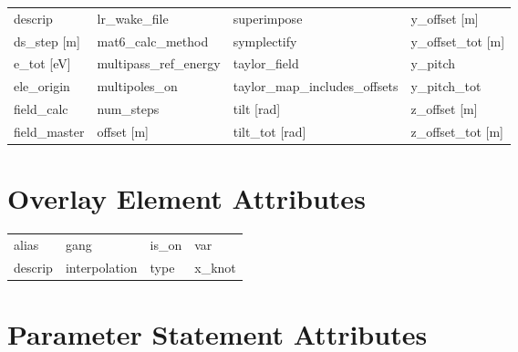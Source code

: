 \begin{tabular}{llll}
descrip                          & lr_wake_file                     & superimpose                      & y_offset [m]                     \\
ds_step [m]                      & mat6_calc_method                 & symplectify                      & y_offset_tot [m]                 \\
e_tot [eV]                       & multipass_ref_energy             & taylor_field                     & y_pitch                          \\
ele_origin                       & multipoles_on                    & taylor_map_includes_offsets      & y_pitch_tot                      \\
field_calc                       & num_steps                        & tilt [rad]                       & z_offset [m]                     \\
field_master                     & offset [m]                       & tilt_tot [rad]                   & z_offset_tot [m]                 \\
 \bottomrule
 \end{tabular}
 \vfill
 
 \section{Overlay Element Attributes}
 \label{s:list.overlay}
 
 \begin{tabular}{llll} \toprule
alias                            & gang                             & is_on                            & var                              \\
descrip                          & interpolation                    & type                             & x_knot                           \\
 \bottomrule
 \end{tabular}
 \vfill
 
 \section{Parameter Statement Attributes}
 \label{s:list.parameter}
 
